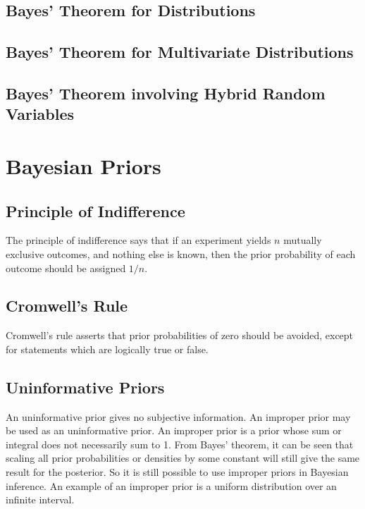 \documentclass[11pt]{report} %
\begin{document}
\subsection{Bayes' Theorem for Distributions}

\subsection{Bayes' Theorem for Multivariate Distributions}

\subsection{Bayes' Theorem involving Hybrid Random Variables}

\section{Bayesian Priors}

\subsection{Principle of Indifference}

The principle of indifference says that if an experiment yields $n$ mutually exclusive outcomes, and nothing else is known, then the prior probability of each outcome should be assigned $1/n$.

\subsection{Cromwell's Rule}

Cromwell's rule asserts that prior probabilities of zero should be avoided, except for statements which are logically true or false.

\subsection{Uninformative Priors}

An uninformative prior gives no subjective information. An improper prior may be used as an uninformative prior. An improper prior is a prior whose sum or integral does not necessarily sum to 1. From Bayes' theorem, it can be seen that scaling all prior probabilities or densities by some constant will still give the same result for the posterior. So it is still possible to use improper priors in Bayesian inference. An example of an improper prior is a uniform distribution over an infinite interval.
\end{document}
